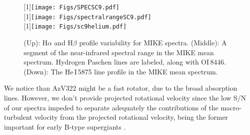 \documentclass[useAMS,usenatbib]{mn2e}
\begin{document}
\begin{figure}
\scalebox{1}[1]{\texttt{[image: Figs/SPECSC9.pdf]}} \\
\scalebox{1}[1]{\texttt{[image: Figs/spectralrangeSC9.pdf]}} \\
\scalebox{1}[1]{\texttt{[image: Figs/sc9helium.pdf]}} 
\caption{(Up): H$\alpha$ and H$\beta$ profile variability for MIKE spectra. (Middle): 
A segment of the near-infrared spectral range in the MIKE mean spectrum. Hydrogen Paschen lines are labeled, along with OI\,8446.
(Down): The He\,I\,5875 line profile in the MIKE mean spectrum.  }
  \label{x}
\end{figure}



 We notice  than AzV322 might be a fast rotator, due to the broad absorption lines. However, we don't provide projected rotational velocity since 
 the low S/N of our spectra impeded to separate adequately the contributions of the 
macro-turbulent velocity from the projected rotational velocity, being the former important for early B-type supergiants  \citep{2006A&A...451..603D}.





\end{document}
